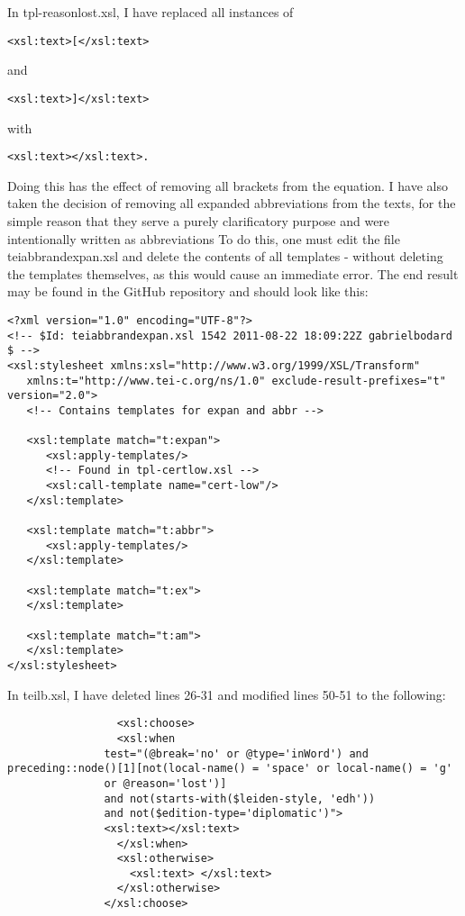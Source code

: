 In tpl-reasonlost.xsl, I have replaced all instances of
\begin{lstlisting}
<xsl:text>[</xsl:text> 
\end{lstlisting}
and 
\begin{lstlisting}
<xsl:text>]</xsl:text> 
\end{lstlisting}
with
\begin{lstlisting}
<xsl:text></xsl:text>.
\end{lstlisting}

Doing this has the effect of removing all brackets from the equation. I have
also taken the decision of removing all expanded abbreviations from the texts,
for the simple reason that they serve a purely clarificatory purpose and were
intentionally written as abbreviations  To do this, one must edit the file
teiabbrandexpan.xsl and delete the contents of all templates - without deleting
the templates themselves, as this would cause an immediate error. The end
result may be found in the GitHub repository and should look like this:

\begin{lstlisting}
<?xml version="1.0" encoding="UTF-8"?>
<!-- $Id: teiabbrandexpan.xsl 1542 2011-08-22 18:09:22Z gabrielbodard $ -->
<xsl:stylesheet xmlns:xsl="http://www.w3.org/1999/XSL/Transform"
   xmlns:t="http://www.tei-c.org/ns/1.0" exclude-result-prefixes="t"  version="2.0">
   <!-- Contains templates for expan and abbr -->

   <xsl:template match="t:expan">
      <xsl:apply-templates/>
      <!-- Found in tpl-certlow.xsl -->
      <xsl:call-template name="cert-low"/>
   </xsl:template>

   <xsl:template match="t:abbr">
      <xsl:apply-templates/>
   </xsl:template>

   <xsl:template match="t:ex">
   </xsl:template>

   <xsl:template match="t:am">
   </xsl:template>
</xsl:stylesheet>
\end{lstlisting}


In teilb.xsl, I have deleted lines 26-31 and modified lines 50-51 to the
following:

\begin{lstlisting}
                 <xsl:choose>
                 <xsl:when
               test="(@break='no' or @type='inWord') and preceding::node()[1][not(local-name() = 'space' or local-name() = 'g'
               or @reason='lost')]
               and not(starts-with($leiden-style, 'edh'))
               and not($edition-type='diplomatic')">
               <xsl:text></xsl:text>
                 </xsl:when>
                 <xsl:otherwise>
                   <xsl:text> </xsl:text>
                 </xsl:otherwise>
               </xsl:choose>
\end{lstlisting}


